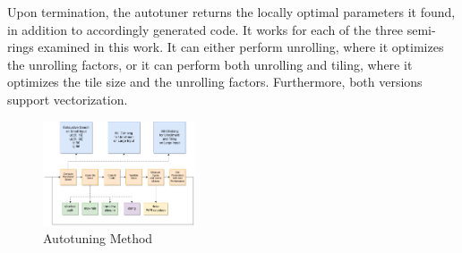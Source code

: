 Upon termination, the autotuner returns the locally optimal parameters it found, in addition to accordingly generated code. It works for each of the three semi-rings examined in this work. It can either perform unrolling, where it optimizes the unrolling factors, or it can perform both unrolling and tiling, where it optimizes the tile size and the unrolling factors. Furthermore, both versions support vectorization.

\begin{figure}[h]
    \centering
    \includegraphics[width=0.4\textwidth]{img/autotuning.png}
    \caption{Autotuning Method}
    \label{img:autotuner}
\end{figure}





